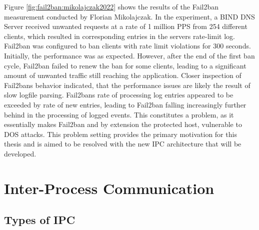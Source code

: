 Figure \ref{fig:fail2ban:mikolajczak2022} shows the results of the Fail2ban measurement conducted by Florian Mikolajczak. In the experiment, a BIND DNS Server received unwanted requests at a rate of 1 million \ac{PPS} from 254 different clients,
which resulted in corresponding entries in the servers rate-limit log. Fail2ban was configured to ban clients with rate limit violations for 300 seconds. Initially, the performance was as expected. However, after 
the end of the first ban cycle, Fail2ban failed to renew the ban for some clients, leading to a significant amount of unwanted traffic still reaching the application. Closer inspection of Fail2bans behavior indicated,
that the performance issues are likely the result of slow logfile parsing. Fail2bans rate of processing log entries appeared to be exceeded by rate of new entries, leading to Fail2ban falling increasingly further behind
in the processing of logged events. This constitutes a problem, as it essentially makes Fail2ban and by extension the protected host, vulnerable to \ac{DOS} attacks. This problem setting provides the primary motivation for this
thesis and is aimed to be resolved with the new \ac{IPC} architecture that will be developed.

\section{Inter-Process Communication}
\label{sec:ipc}

\subsection{Types of IPC}
\label{sec:ipc_types}

